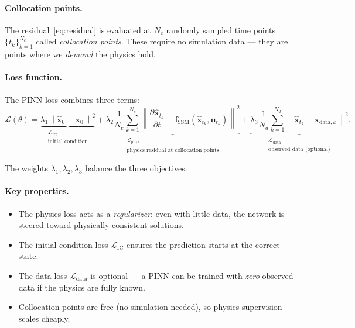 \documentclass[11pt]{article}
\newcommand{\xhat}{\hat{\bm{x}}}
\newcommand{\uvec}{\bm{u}}
\newcommand{\xvec}{\bm{x}}
\newcommand{\fssm}{\bm{f}_{\mathrm{SSM}}}
\begin{document}
\paragraph{Collocation points.} The residual~\eqref{eq:residual} is evaluated at $N_c$ randomly sampled time points $\{t_k\}_{k=1}^{N_c}$ called \emph{collocation points}. These require no simulation data --- they are points where we \emph{demand} the physics hold.

\paragraph{Loss function.} The PINN loss combines three terms:
\begin{equation}
    \mathcal{L}(\theta) = \underbrace{\lambda_1 \left\| \xhat_0 - \xvec_0 \right\|^2}_{\substack{\mathcal{L}_{\mathrm{IC}} \\ \text{initial condition}}}
    + \underbrace{\lambda_2 \frac{1}{N_c}\sum_{k=1}^{N_c} \left\| \frac{\partial \xhat_{t_k}}{\partial t} - \fssm(\xhat_{t_k}, \uvec_{t_k}) \right\|^2}_{\substack{\mathcal{L}_{\mathrm{phys}} \\ \text{physics residual at collocation points}}}
    + \underbrace{\lambda_3 \frac{1}{N_d}\sum_{k=1}^{N_d} \left\| \xhat_{t_k} - \xvec_{\mathrm{data},k} \right\|^2}_{\substack{\mathcal{L}_{\mathrm{data}} \\ \text{observed data (optional)}}}.
    \label{eq:pinn-loss}
\end{equation}

The weights $\lambda_1, \lambda_2, \lambda_3$ balance the three objectives.

\paragraph{Key properties.}
\begin{itemize}
    \item The physics loss acts as a \emph{regularizer}: even with little data, the network is steered toward physically consistent solutions.
    \item The initial condition loss $\mathcal{L}_{\mathrm{IC}}$ ensures the prediction starts at the correct state.
    \item The data loss $\mathcal{L}_{\mathrm{data}}$ is optional --- a PINN can be trained with \emph{zero} observed data if the physics are fully known.
    \item Collocation points are free (no simulation needed), so physics supervision scales cheaply.
\end{itemize}
\end{document}
